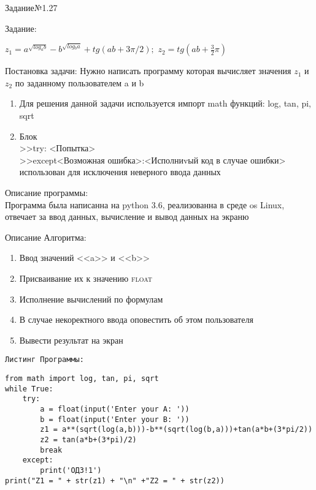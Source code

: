 \documentclass[a4paper]{article}
\begin{document}
\newpage
Задание№1.27\\
    \begin{lab1}
        Задание:
        \begin{center}
            $z{_1}={a^{\sqrt{log{_a}b}}}-{b^{\sqrt{log{_b}a}}}+tg(ab+3{\pi}/2);$ \hspace{1cm}$z{_2}={tg(ab+\frac{3}{2}\pi)}$
        \end{center}
    \begin{introduction}
    Постановка задачи:
    Нужно написать программу которая вычисляет значения $z{_1}$ и $z{_2}$ по заданному пользователем a и b
        \begin{enumerate}
            \item Для решения данной задачи используется импорт math функций: log, tan, pi, sqrt
            \item Блок\\>>try: <Попытка> \\>>except<Возможная ошибка>:<Исполниvый код в случае ошибки>\\использован для исключения неверного ввода данных
        \end{enumerate}
        
    \end{introduction}
    \begin{description}
        Описание программы:\\
        \small{Программа была написанна на python 3.6, реализованна в среде os Linux, отвечает за ввод данных, вычисление и вывод данных на экраню}
    \end{description}
    \begin{algoritm}
        Описание Алгоритма:
        \small\begin{enumerate}
            \item Ввод значений <<a>> и <<b>>
            \item Присваивание их к значению \textsc{float}
            \item Исполнение вычислений по формулам
            \item В случае некоректного ввода оповестить об этом пользователя
            \item Вывести результат на экран
        \end{enumerate}
    \end{algoritm}
        \texttt{Листинг Программы:}
    \begin{verbatim}
from math import log, tan, pi, sqrt
while True:
    try:
        a = float(input('Enter your A: '))
        b = float(input('Enter your B: '))
        z1 = a**(sqrt(log(a,b)))-b**(sqrt(log(b,a)))+tan(a*b+(3*pi/2))
        z2 = tan(a*b+(3*pi)/2)
        break
    except:
        print('ОДЗ!1')
print("Z1 = " + str(z1) + "\n" +"Z2 = " + str(z2))
    \end{verbatim}
    \end{lab1}
\end{document}
